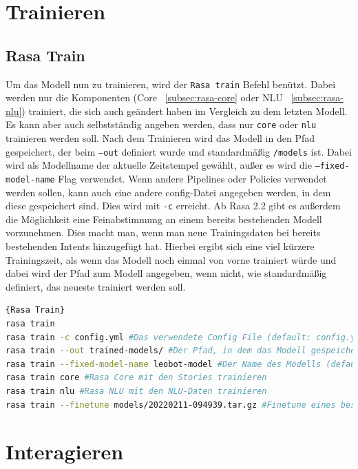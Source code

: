 \section{Trainieren}\label{section:train}

\subsection{Rasa Train}\label{subsec:rasa-train}

Um das Modell nun zu trainieren, wird der \texttt{Rasa train} Befehl benützt.
Dabei werden nur die Komponenten (Core ~\ref{subsec:rasa-core} oder NLU ~\ref{subsec:rasa-nlu}) trainiert, die sich auch geändert haben im Vergleich zu dem letzten Modell.
Es kann aber auch selbstständig angeben werden, dass nur \texttt{core} oder \texttt{nlu} trainieren werden soll.
Nach dem Trainieren wird das Modell in den Pfad gespeichert, der beim \texttt{--out} definiert wurde und standardmäßig \texttt{/models} ist.
Dabei wird als Modellname der aktuelle Zeitstempel gewählt, außer es wird die \texttt{--fixed-model-name} Flag verwendet.
Wenn andere Pipelines oder Policies verwendet werden sollen, kann auch eine andere config-Datei angegeben werden, in dem diese gespeichert sind.
Dies wird mit \texttt{-c} erreicht.
Ab Rasa 2.2 gibt es außerdem die Möglichkeit eine Feinabstimmung an einem bereits bestehenden Modell vorzunehmen.
Dies macht man, wenn man neue Trainingsdaten bei bereits bestehenden Intents hinzugefügt hat.
Hierbei ergibt sich eine viel kürzere Trainingszeit, als wenn das Modell noch einmal von vorne trainiert würde und dabei wird der Pfad zum Modell angegeben, wenn nicht, wie standardmäßig definiert, das neueste trainiert werden soll.\cite{rasaTrain}

\begin{lstlisting}[language=bash,label={lst:rasa-train},caption={Rasa Train Befehle}]{Rasa Train}
rasa train
rasa train -c config.yml #Das verwendete Config File (default: config.yml)
rasa train --out trained-models/ #Der Pfad, in dem das Modell gespeichert wird (default: models/)
rasa train --fixed-model-name leobot-model #Der Name des Modells (default: <timestamp>.tar.gz)
rasa train core #Rasa Core mit den Stories trainieren
rasa train nlu #Rasa NLU mit den NLU-Daten trainieren
rasa train --finetune models/20220211-094939.tar.gz #Finetune eines bestehenden Modells
\end{lstlisting}


\section{Interagieren}\label{sec:interact}

